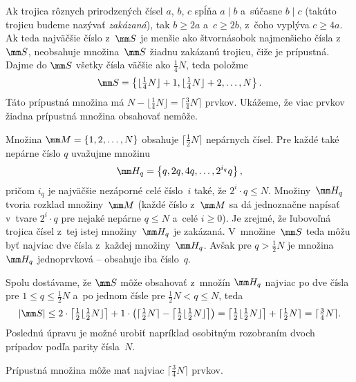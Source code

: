 {%
Ak trojica rôznych prirodzených čísel $a$, $b$, $c$ spĺňa $a\mid b$ a~súčasne $b\mid c$ (takúto trojicu budeme nazývať {\it zakázaná}\/), tak $b\ge2a$ a~$c\ge2b$, z~čoho vyplýva $c\ge4a$. Ak teda najväčšie číslo z~$\mm S$ je menšie ako štvornásobok najmenšieho čísla z~$\mm S$, neobsahuje množina~$\mm S$ žiadnu zakázanú trojicu, čiže je prípustná. Dajme do $\mm S$ všetky čísla väčšie ako $\frac14N$, teda položme
$$
\mm S=\left\{\lfloor\tfrac14N\rfloor+1,\lfloor\tfrac14N\rfloor+2,\dots,N\right\}.
$$
Táto prípustná množina má $N-\lfloor\frac14N\rfloor=\lceil\frac34N\rceil$ prvkov. Ukážeme, že viac prvkov žiadna prípustná množina obsahovať nemôže.

Množina $\mm M=\{1,2,\dots,N\}$ obsahuje $\lceil\frac12N\rceil$ nepárnych čísel. Pre každé také nepárne číslo $q$ uvažujme množinu
$$
\mm H_q=\left\{q,2q,4q,\dots,2^{i_q}q\right\},
$$
pričom $i_q$ je najväčšie nezáporné celé číslo~$i$ také, že $2^i\cdot q\le N$. Množiny~$\mm H_q$ tvoria rozklad množiny~$\mm M$ (každé číslo z~$\mm M$ sa dá jednoznačne napísať v~tvare $2^i\cdot q$ pre nejaké nepárne $q\le N$ a~celé $i\ge0$). Je zrejmé, že ľubovoľná trojica čísel z~tej istej množiny~$\mm H_q$ je zakázaná. V~množine~$\mm S$ teda môžu byť najviac dve čísla z~každej množiny~$\mm H_q$. Avšak pre $q>\frac12N$ je množina $\mm H_q$ jednoprvková -- obsahuje iba číslo~$q$.

Spolu dostávame, že $\mm S$ môže obsahovať z~množín $\mm H_q$ najviac po dve čísla pre $1\le q\le\frac12N$ a~po jednom čísle pre $\frac12N<q\le N$, teda
$$
|\mm S|\le 2\cdot \left\lceil\tfrac12\lfloor\tfrac12N\rfloor\right\rceil + 1\cdot\left(\lceil\tfrac12N\rceil-\left\lceil\tfrac12\lfloor\tfrac12N\rfloor\right\rceil\right)=
\left\lceil\tfrac12\lfloor\tfrac12N\rfloor\right\rceil + \lceil\tfrac12N\rceil = \lceil\tfrac34N\rceil.
$$
Poslednú úpravu je možné urobiť napríklad osobitným rozobraním dvoch prípadov podľa parity čísla~$N$.

\odpoved
Prípustná množina môže mať najviac $\lceil\frac34N\rceil$ prvkov.
}

